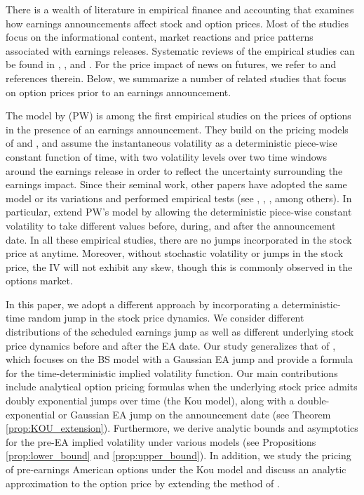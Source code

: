 \documentclass[11pt]{article}
\numberwithin{equation}{section}
\numberwithin{theorem}{section}
\begin{document}
There is a wealth of literature in empirical  finance and accounting that examines how earnings announcements affect stock
and option prices.  Most of the studies focus on  the informational
content, market reactions and  price patterns associated with  earnings releases. Systematic reviews of the empirical studies  can be found in  \citet{Dubinsky2006},
\citet{Barth2011}, \citet{Rogers2009} and \citet{Billings2010}. For the price impact of news on futures, we refer to \cite{Kiseop} and references therein.   Below, we summarize a number of related studies that focus on option prices  prior to an earnings announcement. 

The model by  \citet{Patell1981} (PW)  is among  the first empirical studies on  the prices of  options in the presence of an earnings announcement. They build on the pricing models of \cite{Black1973}  and \citet{Merton1973}, and assume the instantaneous volatility
as a deterministic piece-wise constant  function of time, with   two volatility levels over  two time windows around the earnings release in order to  reflect the uncertainty surrounding  the earnings impact.  Since their seminal work, other papers have adopted the same model or its variations and performed  empirical tests
(see \citet{Donders1996}, \citet{Isakov2001}, \citet{Barth2011}, among others). In particular, \citet{Barth2011}
extend PW's model by allowing the deterministic piece-wise constant volatility to take different values before, during, and after the announcement date.  In all these empirical studies, there are no jumps incorporated in the stock price at anytime.  Moreover, without stochastic volatility or jumps in the  stock price, the IV will not exhibit any skew, though this  is commonly observed in the options market. 

In this paper, we adopt  a different approach by incorporating a deterministic-time random jump in the  stock price dynamics. We consider  different  distributions of   the scheduled
earnings jump as well as different underlying stock price dynamics before and after the EA date.  Our study generalizes that of  \citet{Dubinsky2006}, which  focuses on   the BS  model with a Gaussian EA jump and provide a formula for the time-deterministic  implied volatility function.    Our main contributions include analytical option pricing formulas when the underlying stock price admits doubly exponential jumps over time (the Kou model), along with a double-exponential or  Gaussian EA   jump on the   announcement date (see Theorem \ref{prop:KOU_extension}). Furthermore, we  derive  analytic  bounds and asymptotics for the pre-EA implied volatility under various models (see Propositions \ref{prop:lower_bound} and \ref{prop:upper_bound}). In addition, we study the  pricing of pre-earnings  American options  under the Kou model and  discuss an analytic approximation to the    option price by extending the method of  \cite{Barone-Adesi1987}.  
\end{document}
